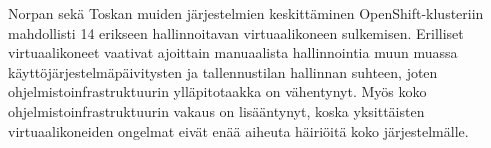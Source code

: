 Norpan sekä Toskan muiden järjestelmien keskittäminen OpenShift-klusteriin mahdollisti 14 erikseen hallinnoitavan virtuaalikoneen sulkemisen.
Erilliset virtuaalikoneet vaativat ajoittain manuaalista hallinnointia muun muassa käyttöjärjestelmäpäivitysten ja tallennustilan hallinnan suhteen, joten ohjelmistoinfrastruktuurin ylläpitotaakka on vähentynyt.
Myös koko ohjelmistoinfrastruktuurin vakaus on lisääntynyt, koska yksittäisten virtuaalikoneiden ongelmat eivät enää aiheuta häiriöitä koko järjestelmälle.
